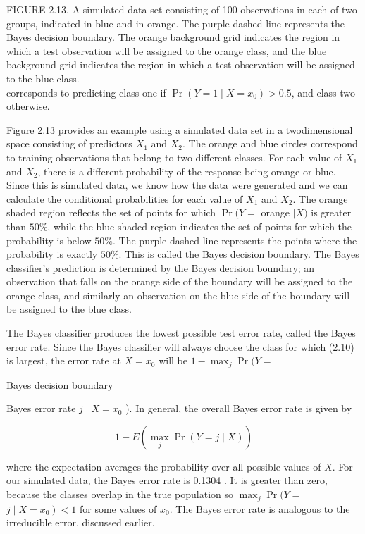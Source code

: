\documentclass[10pt]{article}
\begin{document}
FIGURE 2.13. A simulated data set consisting of 100 observations in each of two groups, indicated in blue and in orange. The purple dashed line represents the Bayes decision boundary. The orange background grid indicates the region in which a test observation will be assigned to the orange class, and the blue background grid indicates the region in which a test observation will be assigned to the blue class.\\
corresponds to predicting class one if $\operatorname{Pr}\left(Y=1 \mid X=x_{0}\right)>0.5$, and class two otherwise.

Figure 2.13 provides an example using a simulated data set in a twodimensional space consisting of predictors $X_{1}$ and $X_{2}$. The orange and blue circles correspond to training observations that belong to two different classes. For each value of $X_{1}$ and $X_{2}$, there is a different probability of the response being orange or blue. Since this is simulated data, we know how the data were generated and we can calculate the conditional probabilities for each value of $X_{1}$ and $X_{2}$. The orange shaded region reflects the set of points for which $\operatorname{Pr}(Y=$ orange $\mid X)$ is greater than $50 \%$, while the blue shaded region indicates the set of points for which the probability is below $50 \%$. The purple dashed line represents the points where the probability is exactly $50 \%$. This is called the Bayes decision boundary. The Bayes classifier's prediction is determined by the Bayes decision boundary; an observation that falls on the orange side of the boundary will be assigned to the orange class, and similarly an observation on the blue side of the boundary will be assigned to the blue class.

The Bayes classifier produces the lowest possible test error rate, called the Bayes error rate. Since the Bayes classifier will always choose the class for which (2.10) is largest, the error rate at $X=x_{0}$ will be $1-\max _{j} \operatorname{Pr}(Y=$

Bayes decision boundary

Bayes error rate $j \mid X=x_{0}$ ). In general, the overall Bayes error rate is given by


\begin{equation*}
1-E\left(\max _{j} \operatorname{Pr}(Y=j \mid X)\right) \tag{2.11}
\end{equation*}


where the expectation averages the probability over all possible values of $X$. For our simulated data, the Bayes error rate is 0.1304 . It is greater than zero, because the classes overlap in the true population so $\max _{j} \operatorname{Pr}(Y=$ $\left.j \mid X=x_{0}\right)<1$ for some values of $x_{0}$. The Bayes error rate is analogous to the irreducible error, discussed earlier.
\end{document}
